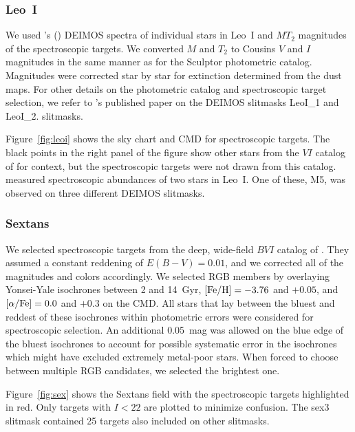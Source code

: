 \documentclass{emulateapj}
\begin{document}
\subsubsection{Leo~I}
\label{sec:leoi}

We used \citeauthor{soh07}'s (\citeyear{soh07}) DEIMOS spectra of
individual stars in Leo~I and $MT_2$ magnitudes of the spectroscopic
targets.  We converted $M$ and $T_2$ to Cousins $V$ and $I$ magnitudes
in the same manner as for the Sculptor photometric catalog.
Magnitudes were corrected star by star for extinction determined from
the \citet{sch98} dust maps.  For other details on the photometric
catalog and spectroscopic target selection, we refer to
\citeauthor{soh07}'s published paper on the DEIMOS slitmasks LeoI\_1
and LeoI\_2. %
slitmasks.

Figure~\ref{fig:leoi} shows the sky chart and CMD for spectroscopic
targets.  The black points in the right panel of the figure show other
stars from the $VI$ catalog of \citet{bel04} for context, but the
spectroscopic targets were not drawn from this catalog.  \citet{she03}
measured spectroscopic abundances of two stars in Leo~I.  One of
these, M5, was observed on three different DEIMOS slitmasks.

\subsubsection{Sextans}

We selected spectroscopic targets from the deep, wide-field $BVI$
catalog of \citet{lee03}.  They assumed a constant reddening of
$E(B-V) = 0.01$, and we corrected all of the magnitudes and colors
accordingly.  We selected RGB members by overlaying Yonsei-Yale
isochrones \citep{dem04} between 2 and 14~Gyr, ${\rm [Fe/H]} = -3.76$ and
$+0.05$, and ${\rm [\alpha/Fe]} = 0.0$ and $+0.3$ on the CMD\@.  All stars that
lay between the bluest and reddest of these isochrones within
photometric errors were considered for spectroscopic selection.  An
additional 0.05~mag was allowed on the blue edge of the bluest
isochrones to account for possible systematic error in the isochrones
which might have excluded extremely metal-poor stars.  When forced to
choose between multiple RGB candidates, we selected the brightest one.

Figure~\ref{fig:sex} shows the Sextans field with the spectroscopic
targets highlighted in red.  Only targets with $I < 22$ are plotted to
minimize confusion.  The sex3 slitmask contained 25 targets also
included on other slitmasks.
\end{document}
